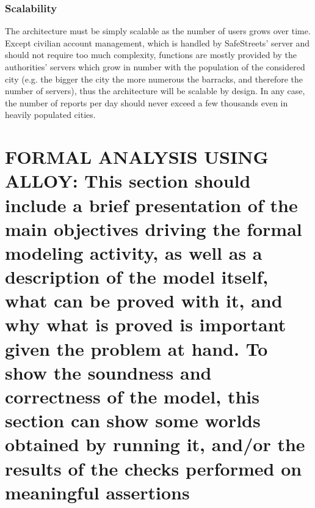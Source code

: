 \documentclass[12pt,a4paper]{article}
\begin{document}
\subsubsection{Scalability}
The architecture must be simply scalable as the number of users grows over time. Except civilian account management, which is handled by SafeStreets' server and should not require too much complexity, functions are mostly provided by the authorities' servers which grow in number with the population of the considered city (e.g. the bigger the city the more numerous the barracks, and therefore the number of servers), thus the architecture will be scalable by design. In any case, the number of reports per day should never exceed a few thousands even in heavily populated cities.
\section{FORMAL	ANALYSIS	USING	ALLOY: This	section	should include	a	brief	presentation	of the	
main	objectives	driving	the	formal	modeling	activity, as	well	as	a	description	of the	model	
itself,	what	can	be	proved with	it, and	why	what	is	proved is	important	given	the	problem	at	
hand. To	show	 the	soundness	and	correctness	of	the model,	 this	section	can	show	some
worlds	obtained	by	running	it,	and/or	the	results	of	the	checks	performed	on	meaningful	
assertions}
\end{document}
